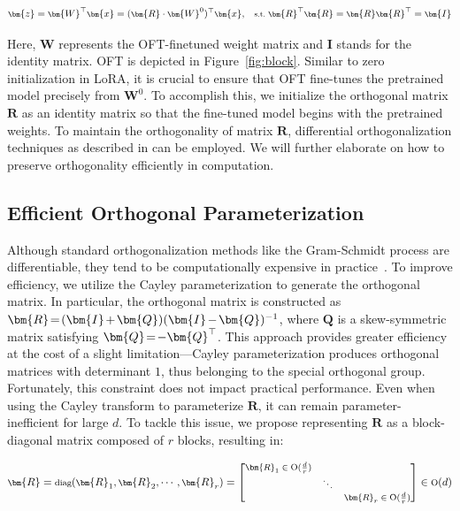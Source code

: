 \begin{equation}\label{eq:oft_general}
    \footnotesize
    \bm{z}=\bm{W}^\top\bm{x}=(\bm{R}\cdot\bm{W}^0)^\top\bm{x},~~~\text{s.t.}~\bm{R}^\top\bm{R}=\bm{R}\bm{R}^\top=\bm{I}
\end{equation}

Here, $\bm{W}$ represents the OFT-finetuned weight matrix and $\bm{I}$ stands for the identity matrix. OFT is depicted in Figure~\ref{fig:block}. Similar to zero initialization in LoRA, it is crucial to ensure that OFT fine-tunes the pretrained model precisely from $\bm{W}^0$. To accomplish this, we initialize the orthogonal matrix $\bm{R}$ as an identity matrix so that the fine-tuned model begins with the pretrained weights. To maintain the orthogonality of matrix $\bm{R}$, differential orthogonalization techniques as described in \cite{liu2021orthogonal,lezcano2019cheap} can be employed. We will further elaborate on how to preserve orthogonality efficiently in computation.

\subsection{Efficient Orthogonal Parameterization}\label{sect:eff_ortho}

Although standard orthogonalization methods like the Gram-Schmidt process are differentiable, they tend to be computationally expensive in practice~\cite{liu2021orthogonal}. To improve efficiency, we utilize the Cayley parameterization to generate the orthogonal matrix. In particular, the orthogonal matrix is constructed as $\thickmuskip=2mu \medmuskip=2mu \bm{R}=(\bm{I}+\bm{Q})(\bm{I}-\bm{Q})^{-1}$, where $\bm{Q}$ is a skew-symmetric matrix satisfying $\thickmuskip=2mu \medmuskip=2mu \bm{Q}=-\bm{Q}^\top$. This approach provides greater efficiency at the cost of a slight limitation—Cayley parameterization produces orthogonal matrices with determinant $1$, thus belonging to the special orthogonal group. Fortunately, this constraint does not impact practical performance. Even when using the Cayley transform to parameterize $\bm{R}$, it can remain parameter-inefficient for large $d$. To tackle this issue, we propose representing $\bm{R}$ as a block-diagonal matrix composed of $r$ blocks, resulting in:

\begin{equation}
    \footnotesize
    \bm{R}=\text{diag}(\bm{R}_1,\bm{R}_2,\cdots,\bm{R}_r)=\begin{bmatrix}
    \bm{R}_1\in \text{O}(\frac{d}{r}) &  &\\
    &\ddots & \\
    & & \bm{R}_r\in \text{O}(\frac{d}{r})
    \end{bmatrix}\in \text{O}(d)
\end{equation}

